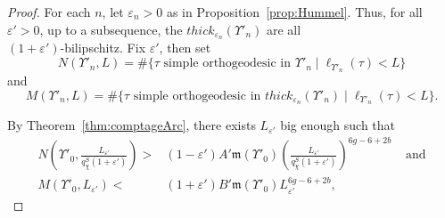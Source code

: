 \documentclass[a4paper,12pt]{article}
\theoremstyle{definition}
\theoremstyle{remark}
\begin{document}
\begin{proof}
    For each $n$, let $\varepsilon_n>0$ as in Proposition~\ref{prop:Hummel}. Thus, for all $\varepsilon'>0$, up to a subsequence, the $thick_{\varepsilon_n}(\Upsilon'_n)$ are all \\
    $(1+\varepsilon')$-bilipschitz. Fix $\varepsilon'$, then set
    \[
        N(\Upsilon'_n,L)= \# \{ \tau \mbox{ simple orthogeodesic in } \Upsilon'_n \mid \ell_{\Upsilon'_n}(\tau) < L \}
    \]
    and
    \[
        M(\Upsilon'_n,L) = \# \{ \tau \mbox{ simple orthogeodesic in } thick_{\varepsilon_n}(\Upsilon'_n) \mid \ell_{\Upsilon'_n}(\tau) < L \}.
    \]

    
    By Theorem~\ref{thm:comptageArc}, there exists $L_{\varepsilon'}$ big enough such that
    \begin{align}
        N \left( \Upsilon'_0,\frac{L_{\varepsilon'}}{q_\chi^S(1+\varepsilon')} \right) > & (1-\varepsilon')A'\mathfrak{m}(\Upsilon'_0)\left( \frac{L_{\varepsilon'}}{q_\chi^S(1+\varepsilon')} \right)^{6g-6+2b} & \mbox{ and}\label{rel:comptage1generic} \\
        M \left( \Upsilon'_0,L_{\varepsilon'} \right) < & (1+\varepsilon')B'\mathfrak{m}(\Upsilon'_0) L_{\varepsilon'} ^{6g-6+2b}, \label{rel:comptage2generic}
    \end{align}
    

\end{proof}
\end{document}
